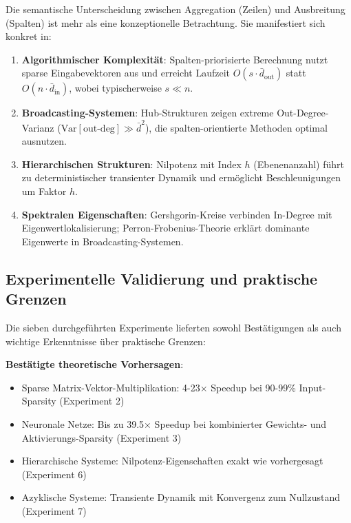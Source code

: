 ﻿\documentclass[a4paper,12pt]{report}
\theoremstyle{definition}
\begin{document}
	Die semantische Unterscheidung zwischen Aggregation (Zeilen) und Ausbreitung (Spalten) ist mehr als eine konzeptionelle Betrachtung. Sie manifestiert sich konkret in:
	
	\begin{enumerate}
		\item \textbf{Algorithmischer Komplexität}: Spalten-priorisierte Berechnung nutzt sparse Eingabevektoren aus und erreicht Laufzeit $O(s \cdot \bar{d}_{\text{out}})$ statt $O(n \cdot \bar{d}_{\text{in}})$, wobei typischerweise $s \ll n$.
		
		\item \textbf{Broadcasting-Systemen}: Hub-Strukturen zeigen extreme Out-Degree-Varianz ($\text{Var}[\text{out-deg}] \gg \bar{d}^2$), die spalten-orientierte Methoden optimal ausnutzen.
		
		\item \textbf{Hierarchischen Strukturen}: Nilpotenz mit Index $h$ (Ebenenanzahl) führt zu deterministischer transienter Dynamik und ermöglicht Beschleunigungen um Faktor $h$.
		
		\item \textbf{Spektralen Eigenschaften}: Gershgorin-Kreise verbinden In-Degree mit Eigenwertlokalisierung; Perron-Frobenius-Theorie erklärt dominante Eigenwerte in Broadcasting-Systemen.
	\end{enumerate}
	
	\subsection{Experimentelle Validierung und praktische Grenzen}
	
	Die sieben durchgeführten Experimente lieferten sowohl Bestätigungen als auch wichtige Erkenntnisse über praktische Grenzen:
	
	\textbf{Bestätigte theoretische Vorhersagen}:
	\begin{itemize}
		\item Sparse Matrix-Vektor-Multiplikation: 4-23$\times$ Speedup bei 90-99\% Input-Sparsity (Experiment 2)
		\item Neuronale Netze: Bis zu 39.5$\times$ Speedup bei kombinierter Gewichts- und Aktivierungs-Sparsity (Experiment 3)
		\item Hierarchische Systeme: Nilpotenz-Eigenschaften exakt wie vorhergesagt (Experiment 6)
		\item Azyklische Systeme: Transiente Dynamik mit Konvergenz zum Nullzustand (Experiment 7)
	\end{itemize}
	
\end{document}
